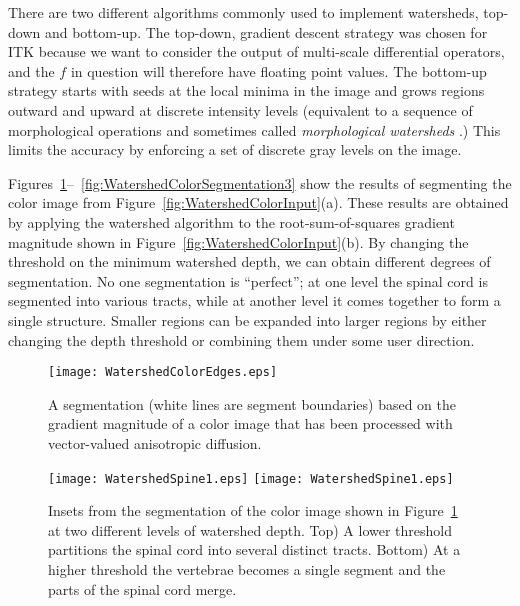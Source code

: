 There are two different algorithms commonly used to implement watersheds,
top-down and bottom-up.  The top-down, gradient descent strategy was chosen for
ITK because we want to consider the output of multi-scale differential
operators, and the $f$ in question will therefore have floating point
values. The bottom-up strategy starts with seeds at the local minima in the
image and grows regions outward and upward at discrete intensity levels
(equivalent to a sequence of morphological operations and sometimes called {\em
morphological watersheds} \cite{Serra1982}.) This limits the accuracy by
enforcing a set of discrete gray levels on the image.

Figures~\ref{fig:WatershedColorSegmentation1}--~\ref{fig:WatershedColorSegmentation3}
show the results of segmenting the color image from
Figure~\ref{fig:WatershedColorInput}(a).  These results are obtained by
applying the watershed algorithm to the root-sum-of-squares gradient magnitude
shown in Figure~\ref{fig:WatershedColorInput}(b).  By changing the threshold on
the minimum watershed depth, we can obtain different degrees of segmentation.
No one segmentation is ``perfect''; at one level the spinal cord is segmented
into various tracts, while at another level it comes together to form a single
structure.  Smaller regions can be expanded into larger regions by either
changing the depth threshold or combining them under some user direction.

\begin{figure}
\centering
\texttt{[image: WatershedColorEdges.eps]}
\caption[Watershed segmentation output]{ A segmentation (white lines are
segment boundaries) based on the gradient magnitude of a color image that has
been processed with vector-valued anisotropic diffusion.}
\protect\label{fig:WatershedColorSegmentation1}
\end{figure}
\begin{figure}
\centering
\texttt{[image: WatershedSpine1.eps]}
\texttt{[image: WatershedSpine1.eps]}
\caption[Watershed segmentation output at two levels]{ Insets from the
segmentation of the color image shown in
Figure~\protect\ref{fig:WatershedColorSegmentation1} at two different levels of
watershed depth.  Top) A lower threshold partitions the spinal cord into
several distinct tracts.  Bottom) At a higher threshold the vertebrae becomes a
single segment and the parts of the spinal cord merge.  }
\protect\label{fig:WatershedColorSegmentation2}
\end{figure}


